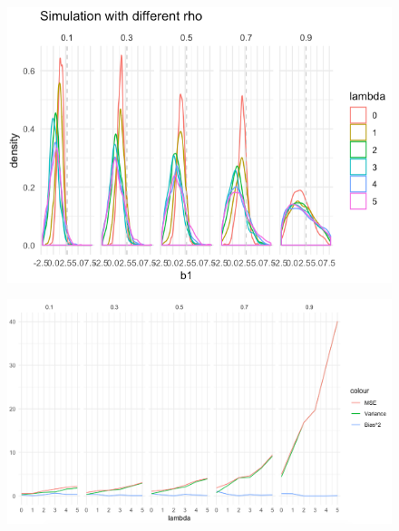 \documentclass{article}
\begin{document}
\begin{figure}[p]
            \centering
            \includegraphics[width=\textwidth]{img/distribution2.png}
\end{figure}

\begin{figure}[p]
    \centering
    \includegraphics[width=\textwidth]{img/simulation2.png}
\end{figure}
\end{document}
